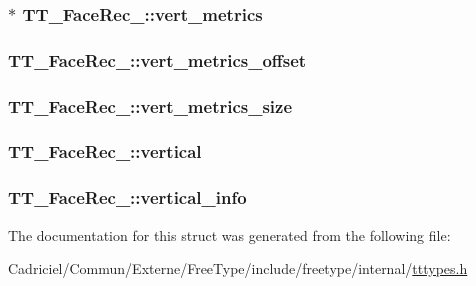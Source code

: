\hypertarget{struct_t_t___face_rec___affbbe1d319e871c4f075e70a931962c4}{
\subsubsection[{vert\-\_\-metrics}]{$\ast$ T\-T\-\_\-\-Face\-Rec\-\_\-\-::vert\-\_\-metrics}}\label{struct_t_t___face_rec___affbbe1d319e871c4f075e70a931962c4}
\hypertarget{struct_t_t___face_rec___a33baf2e26d533d82f06875361fd423d1}{
\subsubsection[{vert\-\_\-metrics\-\_\-offset}]{ T\-T\-\_\-\-Face\-Rec\-\_\-\-::vert\-\_\-metrics\-\_\-offset}}\label{struct_t_t___face_rec___a33baf2e26d533d82f06875361fd423d1}
\hypertarget{struct_t_t___face_rec___aa72d0b40f0d0f3a21ba27a0deab1015f}{
\subsubsection[{vert\-\_\-metrics\-\_\-size}]{ T\-T\-\_\-\-Face\-Rec\-\_\-\-::vert\-\_\-metrics\-\_\-size}}\label{struct_t_t___face_rec___aa72d0b40f0d0f3a21ba27a0deab1015f}
\hypertarget{struct_t_t___face_rec___a04fc41d3860163177a7e0a9bcf71ccf4}{
\subsubsection[{vertical}]{ T\-T\-\_\-\-Face\-Rec\-\_\-\-::vertical}}\label{struct_t_t___face_rec___a04fc41d3860163177a7e0a9bcf71ccf4}
\hypertarget{struct_t_t___face_rec___a43e1c7d3fd3f43ddd7b1bba243bf10bc}{
\subsubsection[{vertical\-\_\-info}]{ T\-T\-\_\-\-Face\-Rec\-\_\-\-::vertical\-\_\-info}}\label{struct_t_t___face_rec___a43e1c7d3fd3f43ddd7b1bba243bf10bc}


The documentation for this struct was generated from the following file\-:\begin{DoxyCompactItemize}
\item 
Cadriciel/\-Commun/\-Externe/\-Free\-Type/include/freetype/internal/\hyperlink{tttypes_8h}{tttypes.\-h}\end{DoxyCompactItemize}
